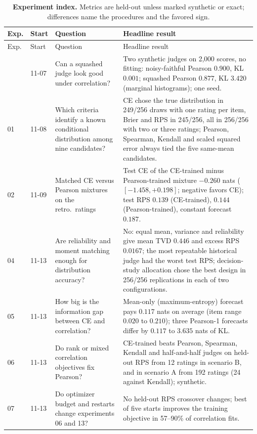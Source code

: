 {\small
\begin{longtable}{@{}p{}p{}p{}p{}@{}}
\caption{\textbf{Experiment index.} Metrics are held-out unless marked synthetic or exact; differences name the procedures and the favored sign.}\label{tab:index}\\
\toprule
Exp. & Start & Question & Headline result \\
\midrule
\endfirsthead
\toprule
Exp. & Start & Question & Headline result \\
\midrule
\endhead
\bottomrule
\endfoot
00 & 11-07 & Can a squashed judge look good under correlation? & Two synthetic judges on 2{,}000 scores, no fitting: noisy-faithful Pearson $0.900$, KL $0.001$; squashed Pearson $0.877$, KL $3.420$ (marginal histograms); one seed. \\
01 & 11-08 & Which criteria identify a known conditional distribution among nine candidates? & CE chose the true distribution in 249/256 draws with one rating per item, Brier and RPS in 245/256, all in 256/256 with two or three ratings; Pearson, Spearman, Kendall and scaled squared error always tied the five same-mean candidates. \\
02 & 11-09 & Matched CE versus Pearson mixtures on the retro.\ ratings & Test CE of the CE-trained minus Pearson-trained mixture $-0.260$ nats ($[-1.458,+0.198]$; negative favors CE); test RPS $0.139$ (CE-trained), $0.144$ (Pearson-trained), constant forecast $0.187$. \\
04 & 11-13 & Are reliability and moment matching enough for distribution accuracy? & No: equal mean, variance and reliability give mean TVD $0.446$ and excess RPS $0.0167$; the most repeatable historical judge had the worst test RPS; decision-study allocation chose the best design in 256/256 replications in each of two configurations. \\
05 & 11-13 & How big is the information gap between CE and correlation? & Mean-only (maximum-entropy) forecast pays $0.117$ nats on average (item range $0.020$ to $0.210$); three Pearson-1 forecasts differ by $0.117$ to $3.635$ nats of KL. \\
06 & 11-13 & Do rank or mixed correlation objectives fix Pearson? & CE-trained beats Pearson, Spearman, Kendall and half-and-half judges on held-out RPS from 12 ratings in scenario B, and in scenario A from 192 ratings (24 against Kendall); synthetic. \\
07 & 11-13 & Do optimizer budget and restarts change experiments 06 and 13? & No held-out RPS crossover changes; best of five starts improves the training objective in 57--90\% of correlation fits. \\

\end{longtable}}
